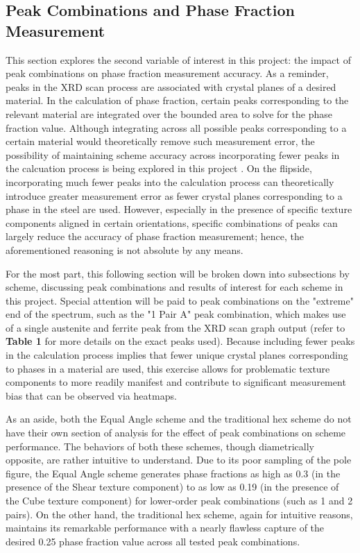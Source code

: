 \documentclass[10pt]{article}
\begin{document}
\subsection{Peak Combinations and Phase Fraction Measurement}
This section explores the second variable of interest in this project:
the impact of peak combinations on phase fraction measurement accuracy.
As a reminder, peaks in the XRD scan process are associated with crystal planes of a
desired material. In the calculation of phase fraction, certain peaks corresponding to the 
relevant material are integrated over the bounded area to solve for the phase fraction value. Although integrating 
across all possible peaks corresponding to a certain material would theoretically remove such measurement error,
the possibility of maintaining scheme accuracy across incorporating fewer peaks in the calcuation process is being explored 
in this project \cite{ref06}. On the flipside, incorporating much fewer peaks into the calculation process can theoretically introduce greater measurement
error as fewer crystal planes corresponding to a phase in the steel are used. However, especially in the presence of specific texture components aligned in certain
orientations, specific combinations of peaks can largely reduce the accuracy of phase fraction measurement; hence, the aforementioned
reasoning is not absolute by any means. 

For the most part, this following section will be broken down into subsections by scheme, discussing peak combinations and results of interest for
each scheme in this project. Special attention will be paid to peak combinations on the "extreme" end of the spectrum, such as the "1 Pair A" peak 
combination, which makes use of a single austenite and ferrite peak from the XRD scan graph output (refer to \textbf{Table 1} for more details on the exact peaks used).
Because including fewer peaks in the calculation process implies that fewer unique crystal planes corresponding to phases in a material are used, this exercise 
allows for problematic texture components 
to more readily manifest and contribute to significant measurement bias that can be observed via heatmaps.

As an aside, both the Equal Angle scheme and the traditional hex scheme do not have their own section of analysis for the effect of peak combinations on 
scheme performance. The behaviors of both these schemes, though diametrically opposite, are rather intuitive to understand. Due to its poor sampling of the pole figure, the Equal Angle 
scheme generates phase fractions as high as 0.3 
(in the presence of the Shear texture component) to as low as 0.19 (in the presence of the Cube texture component) for lower-order peak combinations (such as 1 and 2 pairs). On the other hand, the traditional hex scheme, again for 
intuitive reasons, maintains its remarkable performance with a nearly flawless capture of the desired 0.25 phase fraction value across all tested peak combinations.
\end{document}
